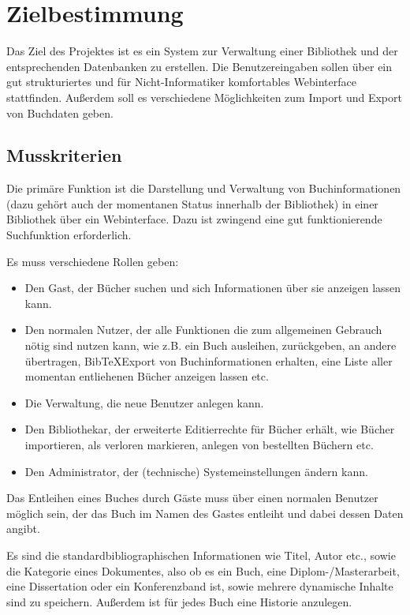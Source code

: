 
\chapter{Zielbestimmung}
Das Ziel des Projektes ist es ein System zur Verwaltung einer Bibliothek und der entsprechenden Datenbanken zu erstellen. Die Benutzereingaben sollen über ein gut strukturiertes und für Nicht-Informatiker komfortables Webinterface stattfinden. Außerdem soll es verschiedene Möglichkeiten zum Import und Export von Buchdaten geben. 

\section{Musskriterien}
Die primäre Funktion ist die Darstellung und Verwaltung von Buchinformationen (dazu gehört auch der momentanen Status innerhalb der Bibliothek) in einer Bibliothek über ein Webinterface. Dazu ist zwingend eine gut funktionierende Suchfunktion erforderlich.

Es muss verschiedene Rollen geben:
\begin{itemize}
  \item Den Gast, der Bücher suchen und sich Informationen über sie anzeigen lassen kann.
  \item Den normalen Nutzer, der alle Funktionen die zum allgemeinen Gebrauch nötig sind nutzen kann, wie z.B. ein Buch ausleihen, zurückgeben, an andere übertragen, Bib\TeX Export von Buchinformationen erhalten, eine Liste aller momentan entliehenen Bücher anzeigen lassen etc.
  \item Die Verwaltung, die neue Benutzer anlegen kann.
  \item Den Bibliothekar, der erweiterte Editierrechte für Bücher erhält, wie Bücher importieren, als verloren markieren, anlegen von bestellten Büchern etc.
\item Den Administrator, der (technische) Systemeinstellungen ändern kann.
\end{itemize}

Das Entleihen eines Buches durch Gäste muss über einen normalen Benutzer möglich sein, der das Buch im Namen des Gastes entleiht und dabei dessen Daten angibt. 

Es sind die standardbibliographischen Informationen wie Titel, Autor etc., sowie die Kategorie eines Dokumentes, also ob es ein Buch, eine Diplom-/Masterarbeit, eine Dissertation oder ein Konferenzband ist, sowie mehrere dynamische Inhalte sind zu speichern. Außerdem ist für jedes Buch eine Historie anzulegen. 

